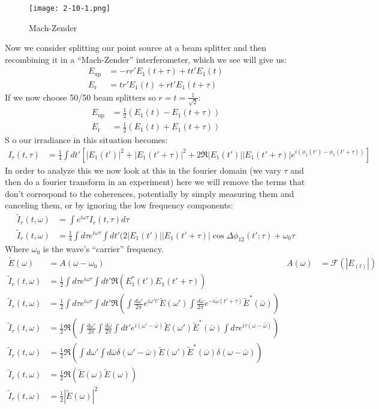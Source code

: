\begin{figure*}[h]
	\centering
	\texttt{[image: 2-10-1.png]}
	\caption*{Mach-Zender}
\end{figure*}
Now we consider splitting our point source at a beam splitter and then recombining it in a ``Mach-Zender'' interferometer, which we see will give us:
\begin{align*}
	E_\text{up} &= -rr'E_1(t+\tau) + tt' E_1(t) \\
	E_\text{r} &= tr' E_1(t) + rt' E_1(t+\tau)
\end{align*}
If we now choose 50/50 beam splitters so $r=t=\frac{1}{\sqrt{2}}$:
\begin{align*}
	E_\text{up} &= \frac{1}{2}(E_1(t) - E_1(t+\tau)) \\
	E_\text{r} &= \frac{1}{2} (E_1(t) + E_1(t+\tau))
\end{align*}
S o our irradiance in this situation becomes:
\begin{align*}
	I_r(t,\tau) &= \frac{1}{4} \int dt' \left[|E_1(t')|^2 + |E_1(t' + \tau)|^2 + 2\Re{|E_1(t')||E_1(t' + \tau)| e^{i(\phi_1(t') - \phi_1(t'+\tau))}}\right]
\end{align*}
In order to analyze this we now look at this in the fourier domain (we vary $\tau$ and then do a fourier transform in an experiment) here we will remove the terms that don't correspond to the coherences, 
potentially by simply measuring them and canceling them, or by ignoring the low frequency components:
\begin{align*}
	\tilde{I}_r(t,\omega) &= \int e^{i\omega\tau} I_r(t,\tau) d\tau \\
	\tilde{I}_r(t,\omega) &= \frac{1}{4}\int d\tau e^{i\omega\tau} \int dt'(2|E_1(t')||E_1(t'+ \tau)|\cos \Delta\phi_{12}(t';\tau) + \omega_0\tau
\end{align*}
Where $\omega_0$ is the wave's ``carrier'' frequency.
\begin{align*}
	\tilde{E}(\omega) &= A(\omega-\omega_0) & A(\omega) &= \mathcal{F}(|E_(t)|) \\
	\tilde{I}_r(t,\omega) &= \frac{1}{2}\int d\tau e^{i\omega\tau} \int dt'\Re(E_1^*(t')E_1(t'+ \tau)) \\
	\tilde{I}_r(t,\omega) &= \frac{1}{2}\int d\tau e^{i\omega\tau} \int dt'\Re\left(\int \frac{d\omega'}{2\pi} e^{i\omega't'} \tilde{E}(\omega')\int \frac{d\bar{\omega}}{2\pi} e^{-i\bar{\omega}(t'+\tau)} \tilde{E}^*(\bar{\omega})\right) \\
	\tilde{I}_r(t,\omega) &= \frac{1}{2}\Re\left(\int \frac{d\omega'}{2\pi}\int \frac{d\bar{\omega}}{2\pi} \int dt'e^{i(\omega' - \bar{\omega})} \tilde{E}(\omega')  \tilde{E}^*(\bar{\omega})\int d\tau  e^{i\tau(\omega-\bar{\omega})}\right) \\
	\tilde{I}_r(t,\omega) &= \frac{1}{2}\Re\left(\int d\omega'\int d\bar{\omega} \delta(\omega' - \bar{\omega}) \tilde{E}(\omega')  \tilde{E}^*(\bar{\omega})\delta(\omega-\bar{\omega})\right) \\
	\tilde{I}_r(t,\omega) &= \frac{1}{2}\Re\left(\tilde{E}(\omega)  \tilde{E}(\omega)\right) \\
	\tilde{I}_r(t,\omega) &= \frac{1}{2}|\tilde{E}(\omega)|^2
\end{align*}

